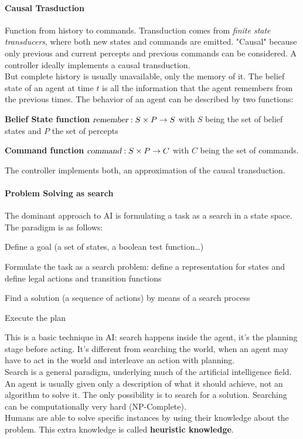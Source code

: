 \documentclass[10pt]{report}
\begin{document}
\paragraph{Causal Trasduction} Function from history to commands. Transduction comes from \textit{finite state transducers}, where both new states and commands are emitted. "Causal" because only previous and current percepts and previous commands can be considered. A controller ideally implements a causal transduction.\\
But complete history is usually unavailable, only the memory of it. The belief state of an agent at time $t$ is all the information that the agent remembers from the previous times. The behavior of an agent can be described by two functions:
\begin{list}{}{}
	\item \textbf{Belief State function} $\textsl{remember}:S\times P\rightarrow S$ with $S$ being the set of belief states and $P$ the set of percepts
	\item \textbf{Command function} $\textsl{command}:S\times P \rightarrow C$ with $C$ being the set of commands.
\end{list}
The controller implements both, an approximation of the causal transduction.
\paragraph{Problem Solving as search} The dominant approach to AI is formulating a task as a search in a state space. The paradigm is as follows:
\begin{list}{}{}
	\item Define a goal (a set of states, a boolean test function\ldots)
	\item Formulate the task as a search problem: define a representation for states and define legal actions and transition functions
	\item Find a solution (a sequence of actions) by means of a search process
	\item Execute the plan
\end{list}
This is a basic technique in AI: search happens inside the agent, it's the planning stage before acting. It's different from searching the world, when an agent may have to act in the world and interleave an action with planning.\\
Search is a general paradigm, underlying much of the artificial intelligence field. An agent is usually given only a description of what it should achieve, not an algorithm to solve it. The only possibility is to search for a solution. Searching can be computationally very hard (NP-Complete).\\
Humans are able to solve specific instances by using their knowledge about the problem. This extra knowledge is called \textbf{heuristic knowledge}.
\end{document}
